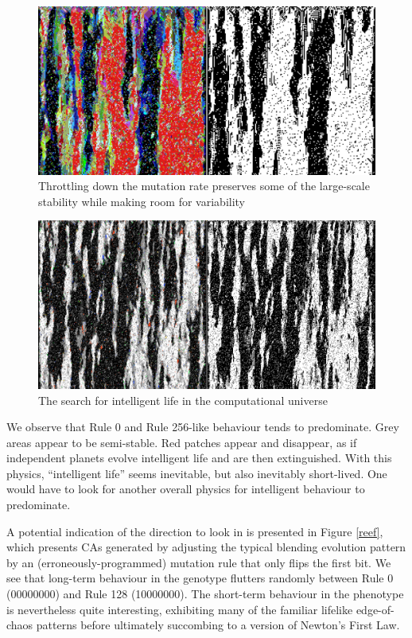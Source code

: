 \documentclass{AISB2008}
\begin{document}
\begin{figure}
\includegraphics[width=\columnwidth]{lamp-down-low.png}
\caption{Throttling down the mutation rate preserves some of the large-scale stability while making room for variability \label{lower-rate}}
\end{figure}

\begin{figure}
\includegraphics[width=\columnwidth]{seti.png}
\caption{The search for intelligent life in the computational universe \label{seti}}
\end{figure}

We observe that Rule 0 and Rule 256-like behaviour tends to
predominate.  Grey areas appear to be semi-stable.  Red patches appear
and disappear, as if independent planets evolve intelligent life and
are then extinguished.  With this physics, ``intelligent life'' seems
inevitable, but also inevitably short-lived.  One would have to look
for another overall physics for intelligent behaviour to predominate.

A potential indication of the direction to look in is presented in
Figure \ref{reef}, which presents CAs generated by adjusting the
typical blending evolution pattern by an (erroneously-programmed)
mutation rule that only flips the first bit.  We see that long-term
behaviour in the genotype flutters randomly between Rule 0 (00000000)
and Rule 128 (10000000).  The short-term behaviour in the phenotype is
nevertheless quite interesting, exhibiting many of the familiar
lifelike edge-of-chaos patterns before ultimately succombing to a
version of Newton's First Law.
\end{document}
